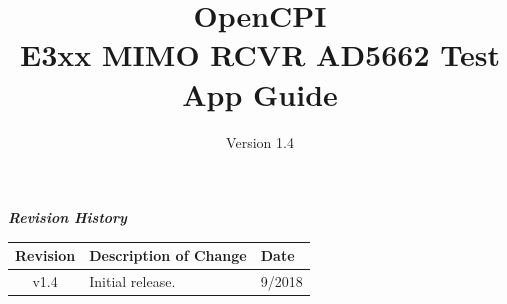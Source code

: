 \def\docTitle{OpenCPI\\ E3xx MIMO RCVR AD5662 Test App Guide}
\def\docVersion{1.4}

\date{Version \docVersion} %
\title{\docTitle}
\usepackage{graphicx}
\graphicspath{ {figures/} }
\usepackage{textcomp}
\usepackage{listings}


\maketitle
	\begin{center}
	\textit{\textbf{Revision History}}
		\begin{table}[H]
		\label{table:revisions} %
			\begin{tabularx}{\textwidth}{|c|X|l|}
			\hline
			\rowcolor{blue}
			\textbf{Revision} & \textbf{Description of Change} & \textbf{Date} \\
		    \hline
		    v1.4 & Initial release. & 9/2018 \\
			\hline
			\end{tabularx}
		\end{table}
	\end{center}

